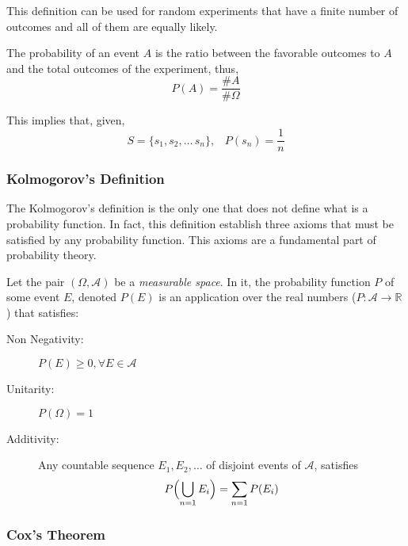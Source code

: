 This definition can be used for random experiments that have a finite number of
outcomes and all of them are equally likely.

The probability of an event $A$ is the ratio between the favorable outcomes to
$A$ and the total outcomes of the experiment, thus,
\begin{equation*}
    P(A) = \dfrac{\#A}{\#\Omega}
\end{equation*}

This implies that, given,
\begin{equation*}
    S = \{s_1,s_2,\dots\, s_n\},\;\;\; P(s_n)=\dfrac{1}{n}
\end{equation*}

\subsubsection{Kolmogorov's Definition} %
\label{ssub:kolmogorov_definition}

The Kolmogorov's definition is the only one that does not define what is a
probability function. In fact, this definition establish three axioms that must
be satisfied by any probability function. This axioms are a fundamental part of
probability theory.

Let the pair $(\Omega, \mathcal{A})$ be a \emph{measurable space}. In it, the
probability function $P$ of some event $E$, denoted $P(E)$ is an application
over the real numbers ($P: \mathcal{A} \rightarrow \mathbb{R}$) that satisfies:

\begin{description}
    \item[Non Negativity:] $P(E) \geq 0, \forall E \in \mathcal{A}$
    \item[Unitarity:] $P(\Omega) = 1$
    \item[Additivity:] Any countable sequence $E_1, E_2, \dots$ of
    disjoint events of $\mathcal{A}$, satisfies
    \begin{equation*}
        P\Bigl(\bigcup_{n=1} E_i \Bigr) = \sum_{n=1} P(E_i)
    \end{equation*}
\end{description}

\subsubsection{Cox's Theorem} %
\label{ssub:cox_s_theorem}

